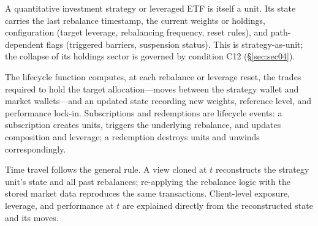 A quantitative investment strategy or leveraged ETF is itself a unit. Its state carries the last rebalance timestamp, the current weights or holdings, configuration (target leverage, rebalancing frequency, reset rules), and path-dependent flags (triggered barriers, suspension status). This is strategy-as-unit; the collapse of its holdings sector is governed by condition C12 (\S\ref{sec:sec04}).

The lifecycle function computes, at each rebalance or leverage reset, the trades required to hold the target allocation---moves between the strategy wallet and market wallets---and an updated state recording new weights, reference level, and performance lock-in. Subscriptions and redemptions are lifecycle events: a subscription creates units, triggers the underlying rebalance, and updates composition and leverage; a redemption destroys units and unwinds correspondingly.

Time travel follows the general rule. A view cloned at $t$ reconstructs the strategy unit's state and all past rebalances; re-applying the rebalance logic with the stored market data reproduces the same transactions. Client-level exposure, leverage, and performance at $t$ are explained directly from the reconstructed state and its moves.
